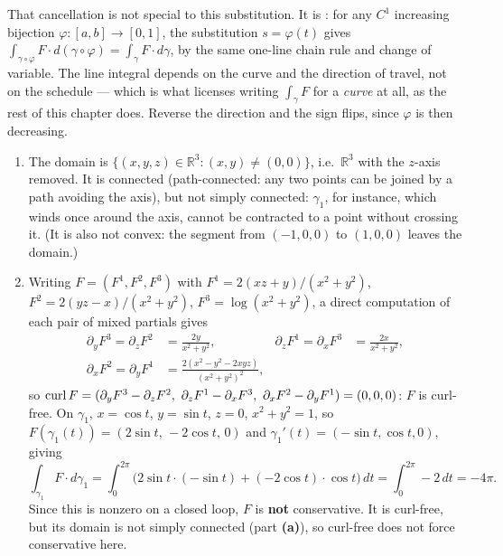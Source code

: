 \begin{exercisesolution}
\begin{remark}
That cancellation is not special to this substitution. It is
: for any $C^1$ increasing bijection
$\varphi : [a,b] \to [0,1]$, the substitution $s = \varphi(t)$ gives
$\int_{\gamma\circ\varphi} F\cdot d(\gamma\circ\varphi) = \int_\gamma F \cdot d\gamma$, by the same
one-line chain rule and change of variable. The line integral depends on the curve and the
direction of travel, not on the schedule --- which is what licenses writing $\int_\gamma F$ for a
\emph{curve} at all, as the rest of this chapter does. Reverse the direction and the sign flips,
since $\varphi$ is then decreasing.
\end{remark}
\end{exercisesolution}

\begin{exercisesolution}
\label{sol:stokes_work_along_paths}
\begin{enumerate}[label=\textbf{(\alph*)}]
  \item The domain is $\{(x,y,z) \in \mathbb{R}^3 : (x,y) \neq (0,0)\}$, i.e.\
    $\mathbb{R}^3$ with the $z$-axis removed. It is connected (path-connected: any two points can
    be joined by a path avoiding the axis), but not simply connected: $\gamma_1$, for instance,
    which winds once around the axis, cannot be contracted to a point without crossing it. (It is
    also not convex: the segment from $(-1,0,0)$ to $(1,0,0)$ leaves the domain.)

  \item Writing $F = (F^1,F^2,F^3)$ with $F^1 = 2(xz+y)/(x^2+y^2)$, $F^2 =
    2(yz-x)/(x^2+y^2)$, $F^3 = \log(x^2+y^2)$, a direct computation of each pair of mixed
    partials gives
    \begin{align*}
      \partial_y F^3 = \partial_z F^2 &= \frac{2y}{x^2+y^2}, &
      \partial_z F^1 = \partial_x F^3 &= \frac{2x}{x^2+y^2}, \\
      \partial_x F^2 = \partial_y F^1 &= \frac{2(x^2-y^2-2xyz)}{(x^2+y^2)^2},
    \end{align*}
    so $\curl F = (\partial_yF^3-\partial_zF^2,\ \partial_zF^1-\partial_xF^3,\ \partial_xF^2-
    \partial_yF^1) = (0,0,0)$: $F$ is curl-free. On $\gamma_1$, $x=\cos t$, $y=\sin t$, $z=0$,
    $x^2+y^2=1$, so $F(\gamma_1(t)) = (2\sin t,\,-2\cos t,\,0)$ and $\gamma_1'(t) = (-\sin t,
    \cos t,0)$, giving
    \[\int_{\gamma_1} F\cdot d\gamma_1 = \int_0^{2\pi} \big(2\sin t\cdot(-\sin t) + (-2\cos t)
      \cdot\cos t\big)\,dt = \int_0^{2\pi} -2\,dt = -4\pi.\]
    Since this is nonzero on a closed loop, $F$ is \textbf{not} conservative. It is curl-free, but
    its domain is not simply connected (part \textbf{(a)}), so curl-free does not force
    conservative here.


\end{enumerate}
\end{exercisesolution}
